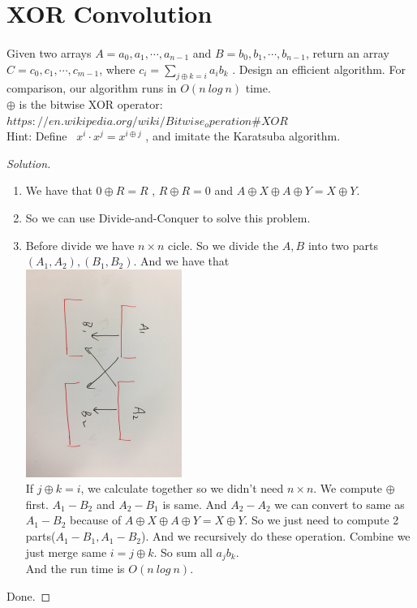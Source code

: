 \documentclass[a4paper]{article}
\newenvironment{solution}
  {\renewcommand\qedsymbol{$\blacksquare$}\begin{proof}[Solution]}
  {\end{proof}}
\begin{document}
\section*{XOR Convolution}
\paragraph{}
Given two arrays $A=a_{0},a_{1},\cdots,a_{n-1}$ and $B=b_{0},b_{1},\cdots,b_{n-1}$, return an array $C=c_{0},c_{1},\cdots,c_{m-1}$,
where $c_{i}=\sum_{j\oplus k=i}a_{i}b_{k}$ . Design an efficient algorithm. For comparison, our algorithm runs in $O(n\ log\ n)$
time.\\
$\oplus $ is the bitwise XOR operator: $https://en.wikipedia.org/wiki/Bitwise_operation\#XOR$\\
Hint: Define \ $x^{i}\cdot x^{j}=x^{i\oplus j}$ , and imitate the Karatsuba algorithm.
\begin{solution}\
  \begin{enumerate}[1)]
    \item We have that $0\oplus R=R$ , $R\oplus R=0$ and $A\oplus X\oplus A\oplus Y=X\oplus Y$.
    \item So we can use Divide-and-Conquer to solve this problem.
    \item Before divide we have $n\times n$ cicle. So we divide the $A, B$ into two parts $(A_{1},A_{2}),(B_{1},B_{2})$. And we have that\\
    \includegraphics[width=2in]{11}\\
    If $j\oplus k=i$, we calculate together so we didn't need $n\times n$. We compute $\oplus$ first. $A_{1}-B_{2}$ and $A_{2}-B_{1}$ is same. And $A_{2}-A_{2}$ we can convert to same as $A_{1}-B_{2}$ because of $A\oplus X\oplus A\oplus Y=X\oplus Y$.
    So we just need to compute 2 parts($A_{1}-B_{1},A_{1}-B_{2}$). And we recursively do these operation. Combine we just merge same $i=j\oplus k$. So sum all $a_{j}b_{k}$. \\
    And the run time is $O(n\ log\ n)$.
  \end{enumerate}
  Done.
\end{solution}
\end{document}
